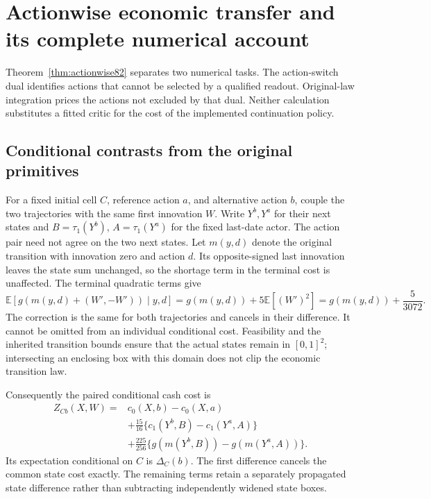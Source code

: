 \section{Actionwise economic transfer and its complete numerical account}\label{app:actionwise82}
Theorem~\ref{thm:actionwise82} separates two numerical tasks. The action-switch dual identifies actions that cannot be selected by a qualified readout. Original-law integration prices the actions not excluded by that dual. Neither calculation substitutes a fitted critic for the cost of the implemented continuation policy.

\subsection{Conditional contrasts from the original primitives}
For a fixed initial cell $C$, reference action $a$, and alternative action $b$, couple the two trajectories with the same first innovation $W$. Write $Y^b,Y^a$ for their next states and $B=\tau_1(Y^b)$, $A=\tau_1(Y^a)$ for the fixed last-date actor. The action pair need not agree on the two next states. Let $m(y,d)$ denote the original transition with innovation zero and action $d$. Its opposite-signed last innovation leaves the state sum unchanged, so the shortage term in the terminal cost is unaffected. The terminal quadratic terms give
\begin{equation}\label{eq:terminal-integral82}
 \mathbb E[g(m(y,d)+(W',-W'))\mid y,d]
             =g(m(y,d))+5\mathbb E[(W')^2]
             =g(m(y,d))+\frac5{3072}.
\end{equation}
The correction is the same for both trajectories and cancels in their difference. It cannot be omitted from an individual conditional cost. Feasibility and the inherited transition bounds ensure that the actual states remain in $[0,1]^2$; intersecting an enclosing box with this domain does not clip the economic transition law.

Consequently the paired conditional cash cost is
\begin{align}
 Z_{Cb}(X,W)={}&c_0(X,b)-c_0(X,a)\nonumber\\
 &+\frac{15}{16}\{c_1(Y^b,B)-c_1(Y^a,A)\}\nonumber\\
 &+\frac{225}{256}\{g(m(Y^b,B))-g(m(Y^a,A))\}.
 \label{eq:paired-cash82}
\end{align}
Its expectation conditional on $C$ is $\Delta_C(b)$. The first difference cancels the common state cost exactly. The remaining terms retain a separately propagated state difference rather than subtracting independently widened state boxes.

